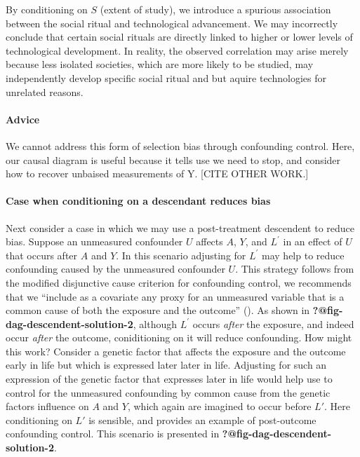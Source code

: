 \documentclass[
  singlecolumn,
  9pt]{article}
\let\oldparagraph\paragraph
\renewcommand{\paragraph}[1]{\oldparagraph{#1}\mbox{}}
\begin{document}
By conditioning on \(S\) (extent of study), we introduce a spurious
association between the social ritual and technological advancement. We
may incorrectly conclude that certain social rituals are directly linked
to higher or lower levels of technological development. In reality, the
observed correlation may arise merely because less isolated societies,
which are more likely to be studied, may independently develop specific
social ritual and but aquire technologies for unrelated reasons.

\paragraph{Advice}\label{advice-1}

We cannot address this form of selection bias through confounding
control. Here, our causal diagram is useful because it tells use we need
to stop, and consider how to recover unbaised measurements of Y. {[}CITE
OTHER WORK.{]}

\paragraph{Case when conditioning on a descendant reduces
bias}\label{case-when-conditioning-on-a-descendant-reduces-bias}

Next consider a case in which we may use a post-treatment descendent to
reduce bias. Suppose an unmeasured confounder \(U\) affects \(A\),
\(Y\), and \(L^\prime\) in an effect of \(U\) that occurs after \(A\)
and \(Y\). In this scenario adjusting for \(L^\prime\) may help to
reduce confounding caused by the unmeasured confounder \(U\). This
strategy follows from the modified disjunctive cause criterion for
confounding control, we recommends that we ``include as a covariate any
proxy for an unmeasured variable that is a common cause of both the
exposure and the outcome'' (). As shown in \textbf{?@fig-dag-descendent-solution-2}, although
\(L^\prime\) occurs \emph{after} the exposure, and indeed occur
\emph{after} the outcome, coniditioning on it will reduce confounding.
How might this work? Consider a genetic factor that affects the exposure
and the outcome early in life but which is expressed later later in
life. Adjusting for such an expression of the genetic factor that
expresses later in life would help use to control for the unmeasured
confounding by common cause from the genetic factors influence on \(A\)
and \(Y\), which again are imagined to occur before \(L'\). Here
conditioning on \(L'\) is sensible, and provides an example of
post-outcome confounding control. This scenario is presented in
\textbf{?@fig-dag-descendent-solution-2}.
\end{document}
